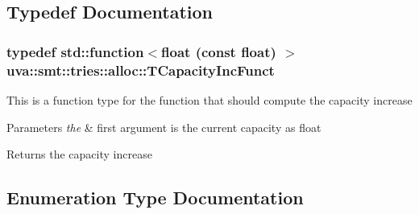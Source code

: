 \subsection{Typedef Documentation}
\hypertarget{namespaceuva_1_1smt_1_1tries_1_1alloc_a3e6a48b58d6f09d775e523709e041d3c}{}
\subsubsection[{T\+Capacity\+Inc\+Funct}]{\setlength{\rightskip}{0pt plus 5cm}typedef std\+::function$<$float (const float) $>$ {\bf uva\+::smt\+::tries\+::alloc\+::\+T\+Capacity\+Inc\+Funct}}\label{namespaceuva_1_1smt_1_1tries_1_1alloc_a3e6a48b58d6f09d775e523709e041d3c}
This is a function type for the function that should compute the capacity increase 
\begin{DoxyParams}{Parameters}
{\em the} & first argument is the current capacity as float \\
\hline
\end{DoxyParams}
\begin{DoxyReturn}{Returns}
the capacity increase 
\end{DoxyReturn}


\subsection{Enumeration Type Documentation}
\hypertarget{namespaceuva_1_1smt_1_1tries_1_1alloc_aa19a45a19458f601785f08cb24e17f16}{}
